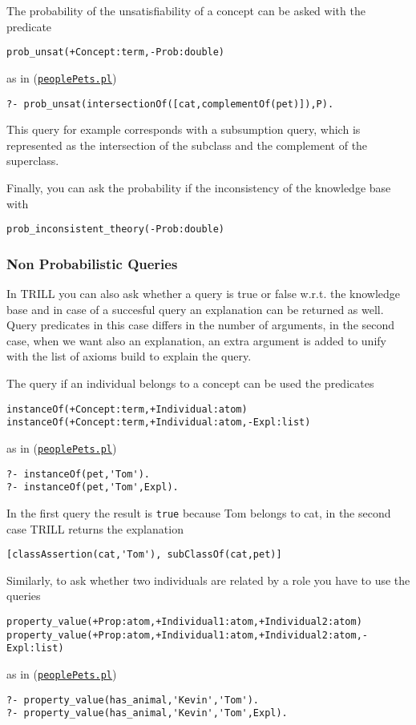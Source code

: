 The probability of the unsatisfiability of a concept can be asked with the predicate
\begin{verbatim}
prob_unsat(+Concept:term,-Prob:double)
\end{verbatim}
as in (\href{http://trill.lamping.unife.it/example/trill/peoplePets.pl}{\texttt{peoplePets.pl}})
\begin{verbatim}
?- prob_unsat(intersectionOf([cat,complementOf(pet)]),P).
\end{verbatim}
This query for example corresponds with a subsumption query, which is represented as the intersection of the subclass and the complement of the superclass.

Finally, you can ask the probability if the inconsistency of the knowledge base with
\begin{verbatim}
prob_inconsistent_theory(-Prob:double)
\end{verbatim}

\subsubsection{Non Probabilistic Queries}
In TRILL you can also ask whether a query is true or false w.r.t. the knowledge base and in case of a succesful query an explanation can be returned as well. 
Query predicates in this case differs in the number of arguments, in the second case, when we want also an explanation, an extra argument is added to unify with the list of axioms
build to explain the query.

The query if an individual belongs to a concept can be used the predicates
\begin{verbatim}
instanceOf(+Concept:term,+Individual:atom)
instanceOf(+Concept:term,+Individual:atom,-Expl:list)
\end{verbatim}
as in (\href{http://trill.lamping.unife.it/example/trill/peoplePets.pl}{\texttt{peoplePets.pl}})
\begin{verbatim}
?- instanceOf(pet,'Tom').
?- instanceOf(pet,'Tom',Expl).
\end{verbatim}
In the first query the result is \verb|true| because Tom belongs to cat, in the second case TRILL returns the explanation 
\begin{verbatim}
[classAssertion(cat,'Tom'), subClassOf(cat,pet)]
\end{verbatim}


Similarly, to ask whether two individuals are related by a role you have to use the queries
\begin{verbatim}
property_value(+Prop:atom,+Individual1:atom,+Individual2:atom)
property_value(+Prop:atom,+Individual1:atom,+Individual2:atom,-Expl:list)
\end{verbatim}
as in (\href{http://trill.lamping.unife.it/example/trill/peoplePets.pl}{\texttt{peoplePets.pl}})
\begin{verbatim}
?- property_value(has_animal,'Kevin','Tom').
?- property_value(has_animal,'Kevin','Tom',Expl).
\end{verbatim}

